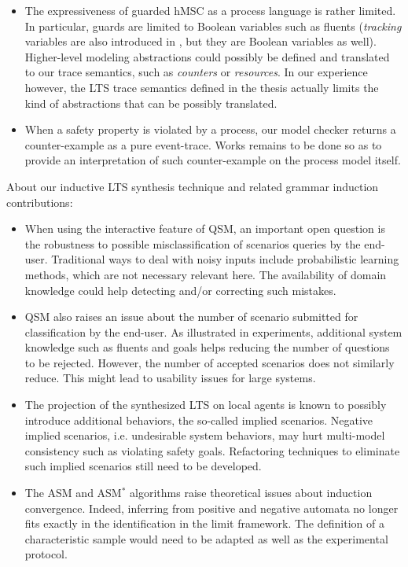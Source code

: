 \begin{itemize}

\item The expressiveness of guarded hMSC as a process language is rather limited. In particular, guards are limited to Boolean variables such as fluents (\emph{tracking} variables are also introduced in \cite{Damas:2011}, but they are Boolean variables as well). Higher-level modeling abstractions could possibly be defined and translated to our trace semantics, such as \emph{counters} or \emph{resources}. In our experience however, the LTS trace semantics defined in the thesis actually limits the kind of abstractions that can be possibly translated. 

\item When a safety property is violated by a process, our model checker returns a counter-example as a pure event-trace. Works remains to be done so as to provide an interpretation of such counter-example on the process model itself. 

\end{itemize}

About our inductive LTS synthesis technique and related grammar induction contributions:

\begin{itemize}

\item When using the interactive feature of QSM, an important open question is the robustness to possible misclassification of scenarios queries by the end-user. Traditional ways to deal with noisy inputs include probabilistic learning methods, which are not necessary relevant here. The availability of domain knowledge could help detecting and/or correcting such mistakes.

\item QSM also raises an issue about the number of scenario submitted for classification by the end-user. As illustrated in experiments, additional system knowledge such as fluents and goals helps reducing the number of questions to be rejected. However, the number of accepted scenarios does not similarly reduce. This might lead to usability issues for large systems.

\item The projection of the synthesized LTS on local agents is known to possibly introduce additional behaviors, the so-called implied scenarios. Negative implied scenarios, i.e. undesirable system behaviors, may hurt multi-model consistency such as violating safety goals. Refactoring techniques to eliminate such implied scenarios still need to be developed.

\item The ASM and ASM$^*$ algorithms raise theoretical issues about induction convergence. Indeed, inferring from positive and negative automata no longer fits exactly in the identification in the limit framework. The definition of a characteristic sample would need to be adapted as well as the experimental protocol.

\end{itemize}
